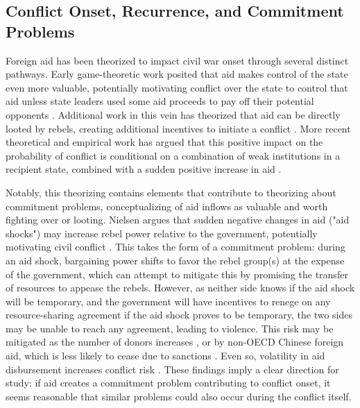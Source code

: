\documentclass[12pt, letterpaper]{article}
\renewcommand{\cite}{\citep}
\begin{document}
\subsection{Conflict Onset, Recurrence, and Commitment Problems}

Foreign aid has been theorized to impact civil war onset through several distinct pathways. Early game-theoretic work posited that aid makes control of the state even more valuable, potentially motivating conflict over the state to control that aid unless state leaders used some aid proceeds to pay off their potential opponents \cite{azam1995, grossman1992}. Additional work in this vein has theorized that aid can be directly looted by rebels, creating additional incentives to initiate a conflict \cite[p.~383]{addison2002}. More recent theoretical and empirical work has argued that this positive impact on the probability of conflict is conditional on a combination of weak institutions in a recipient state, combined with a sudden positive increase in aid \cite{besley2011}. 

Notably, this theorizing contains elements that contribute to theorizing about commitment problems, conceptualizing of aid inflows as valuable and worth fighting over or looting. Nielsen argues that sudden negative changes in aid ("aid shocks") may increase rebel power relative to the government, potentially motivating civil conflict \cite{nielsen2011}. This takes the form of a commitment problem: during an aid shock, bargaining power shifts to favor the rebel group(s) at the expense of the government, which can attempt to mitigate this by promising the transfer of resources to appease the rebels. However, as neither side knows if the aid shock will be temporary, and the government will have incentives to renege on any resource-sharing agreement if the aid shock proves to be temporary, the two sides may be unable to reach any agreement, leading to violence. This risk may be mitigated as the number of donors increases \cite{gutting2017}, or by non-OECD Chinese foreign aid, which is less likely to cease due to sanctions \cite{strange2017}. Even so, volatility in aid disbursement increases conflict risk \cite{nourou2020}. These findings imply a clear direction for study: if aid creates a commitment problem contributing to conflict onset, it seems reasonable that similar problems could also occur during the conflict itself.
\end{document}
